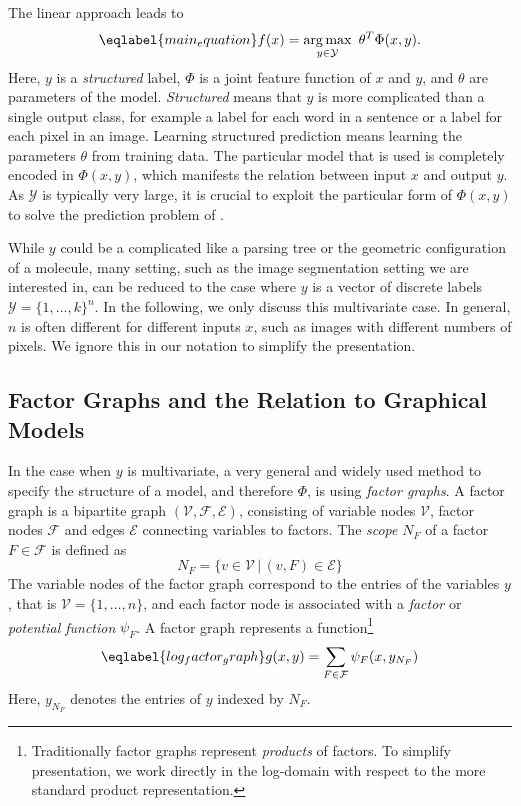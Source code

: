 The linear approach leads to
\begin{equation}\eqlabel{main_equation}
    f(x) = \argmax_{y \in \mathcal{Y}}\  \theta^T \Phi(x, y).
\end{equation}
Here, $y$ is a \emph{structured} label, $\Phi$ is a joint feature function of
$x$ and $y$, and $\theta$ are parameters of the model. \emph{Structured} means
that $y$ is more complicated than a single output class, for example a label
for each word in a sentence or a label for each pixel in an image.
Learning structured prediction means learning the parameters $\theta$ from
training data.  The particular model that is used is completely encoded in
$\Phi(x, y)$, which manifests the relation between input $x$ and output $y$. As
$\mathcal{Y}$ is typically very large, it is crucial to exploit the particular
form of $\Phi(x, y)$ to solve the prediction problem of .

While $y$ could be a complicated like a parsing tree or the geometric
configuration of a molecule, many setting, such as the image segmentation
setting we are interested in, can be reduced to the case where $y$ is a vector of
discrete labels $\mathcal{Y} = \{1, \dotsc, k\}^n$.
In the following, we only discuss this multivariate case. In general, $n$
is often different for different inputs $x$, such as images with different
numbers of pixels.  We ignore this in our notation to simplify the
presentation.

\subsection{Factor Graphs and the Relation to Graphical Models}
In the case when $y$ is multivariate, a very general and widely used method to
specify the structure of a model, and therefore $\Phi$, is using \emph{factor
graphs}. A factor graph is a bipartite graph $(\mathcal{V}, \mathcal{F},
\mathcal{E})$, consisting of variable nodes $\mathcal{V}$, factor nodes
$\mathcal{F}$ and edges $\mathcal{E}$ connecting variables to factors. The
\emph{scope} $N_F$ of a factor $F \in \mathcal{F}$ is defined as
\begin{equation}
    N_F = \{ v \in \mathcal{V} \,|\, (v,F) \in \mathcal{E} \}
\end{equation}
The variable nodes of the factor graph correspond to the entries of the
variables $y$, that is $\mathcal{V} = \{1, \dotsc, n\}$, and each factor node
is associated with a \emph{factor} or \emph{potential function} $\psi_F$.
A factor graph represents a function\footnote{Traditionally factor graphs
 represent \emph{products} of factors.  To simplify presentation, we work
directly in the log-domain with respect to the more standard product representation.}
\begin{equation}\eqlabel{log_factor_graph}
    g(x, y) = \sum_{F \in \mathcal{F}} \psi_F(x, y_{N_F})
\end{equation}
Here, $y_{N_F}$ denotes the entries of $y$ indexed by $N_F$.

